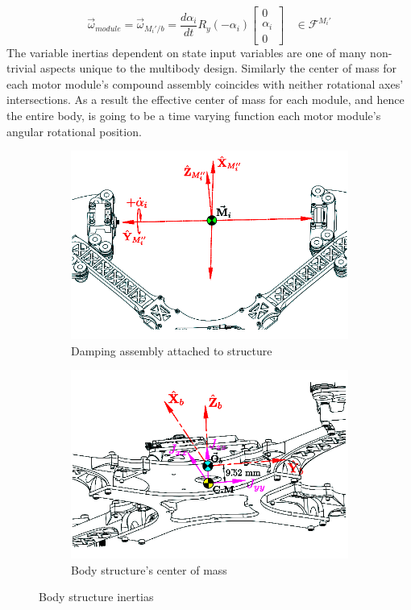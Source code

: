 \begin{equation}
\vec{\omega}_{module}=\vec{\omega}_{M_i'/b}=\frac{d\alpha_i}{dt}R_y(-\alpha_i)\begin{bmatrix}
0\\
\alpha_i\\
0
\end{bmatrix}~~~~\in\mathcal{F}^{M_i'}
\end{equation}
The variable inertias dependent on state input variables are one of many non-trivial aspects unique to the multibody design. Similarly the center of mass for each motor module's compound assembly coincides with neither rotational axes' intersections. As a result the effective center of mass for each module, and hence the entire body, is going to be a time varying function each motor module's angular rotational position.
\begin{figure}[hbtp]
\begin{subfigure}{0.49\textwidth}
\centering
\includegraphics[width=\textwidth]{figs/inertia-damping}
\caption{Damping assembly attached to structure}
\label{fig:inertia-damping}
\end{subfigure}
\begin{subfigure}{0.49\textwidth}
\centering
\includegraphics[width=\textwidth]{figs/inertia-center}
\caption{Body structure's center of mass}
\label{fig:inertia-center}
\end{subfigure}
\caption{Body structure inertias}
\label{fig:damping-center}
\vspace{-10pt}
\end{figure}

